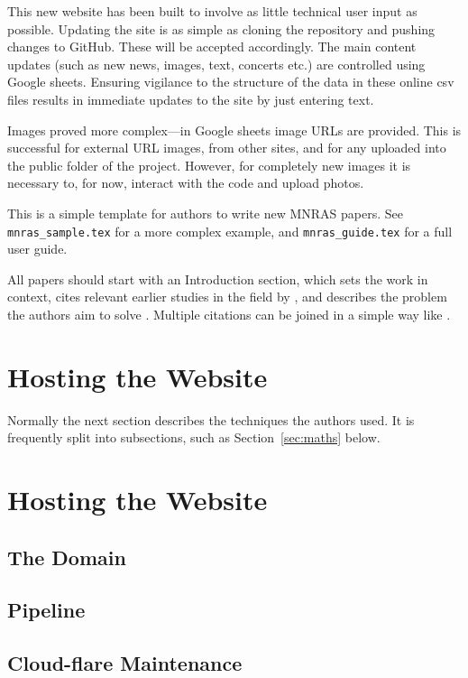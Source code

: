 \documentclass[fleqn,usenatbib]{mnras}
\begin{document}
This new website has been built to involve as little technical user input as possible. Updating the site is as simple as cloning the repository and pushing changes to GitHub. These will be accepted accordingly. The main content updates (such as new news, images, text, concerts etc.) are controlled using Google sheets. Ensuring vigilance to the structure of the data in these online csv files results in immediate updates to the site by just entering text.

Images proved more complex---in Google sheets image URLs are provided. This is successful for external URL images, from other sites, and for any uploaded into the public folder of the project. However, for completely new images it is necessary to, for now, interact with the code and upload photos.

This is a simple template for authors to write new MNRAS papers.
See \texttt{mnras\_sample.tex} for a more complex example, and \texttt{mnras\_guide.tex}
for a full user guide.

All papers should start with an Introduction section, which sets the work
in context, cites relevant earlier studies in the field by \citet{Fournier1901},
and describes the problem the authors aim to solve \citep[e.g.][]{vanDijk1902}.
Multiple citations can be joined in a simple way like \citet{deLaguarde1903, delaGuarde1904}.

\section{Hosting the Website}

Normally the next section describes the techniques the authors used.
It is frequently split into subsections, such as Section~\ref{sec:maths} below.


\section{Hosting the Website}
\subsection{The Domain}

\subsection{Pipeline}

\subsection{Cloud-flare Maintenance}
\end{document}
